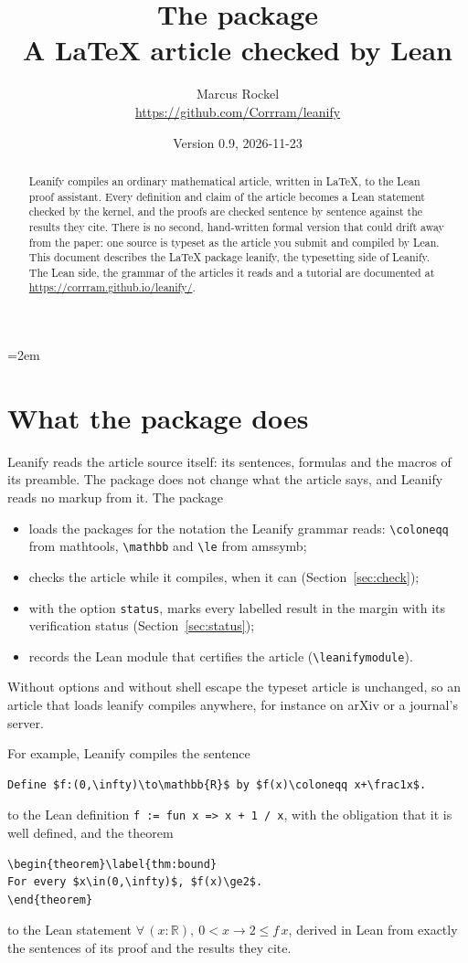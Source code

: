 \documentclass[11pt]{article}
\title{The \pkg{leanify} package\\[2pt]\large A LaTeX article checked by Lean}
\author{Marcus Rockel\\\small\url{https://github.com/Corrram/leanify}}
\date{Version 0.9, 2026-11-23}
\newcommand*\pkg[1]{\textsf{#1}}
\newcommand*\opt[1]{\texttt{#1}}
\newcommand*\cs[1]{\texttt{\textbackslash#1}}
\begin{document}
\emergencystretch=2em
\maketitle

\begin{abstract}
Leanify compiles an ordinary mathematical article, written in LaTeX, to the
Lean proof assistant. Every definition and claim of the article becomes a Lean
statement checked by the kernel, and the proofs are checked sentence by sentence
against the results they cite. There is no second, hand-written formal version
that could drift away from the paper: one source is typeset as the article you
submit and compiled by Lean. This document describes the LaTeX package
\pkg{leanify}, the typesetting side of Leanify. The Lean side, the grammar of
the articles it reads and a tutorial are documented at
\url{https://corrram.github.io/leanify/}.
\end{abstract}

\section{What the package does}

Leanify reads the article source itself: its sentences, formulas and the macros
of its preamble. The package does not change what the article says, and Leanify
reads no markup from it. The package
\begin{itemize}
\item loads the packages for the notation the Leanify grammar reads:
  \cs{coloneqq} from \pkg{mathtools}, \cs{mathbb} and \cs{le} from \pkg{amssymb};
\item checks the article while it compiles, when it can (Section~\ref{sec:check});
\item with the option \opt{status}, marks every labelled result in the margin with
  its verification status (Section~\ref{sec:status});
\item records the Lean module that certifies the article (\cs{leanifymodule}).
\end{itemize}
Without options and without shell escape the typeset article is unchanged, so
an article that loads \pkg{leanify} compiles anywhere, for instance on arXiv or
a journal's server.

For example, Leanify compiles the sentence
\begin{lstlisting}
Define $f:(0,\infty)\to\mathbb{R}$ by $f(x)\coloneqq x+\frac1x$.
\end{lstlisting}
to the Lean definition \texttt{f := fun x => x + 1 / x}, with the obligation
that it is well defined, and the theorem
\begin{lstlisting}
\begin{theorem}\label{thm:bound}
For every $x\in(0,\infty)$, $f(x)\ge2$.
\end{theorem}
\end{lstlisting}
to the Lean statement $\forall\,(x:\mathbb{R}),\ 0<x\to 2\le f\,x$, derived in Lean from
exactly the sentences of its proof and the results they cite.
\end{document}
